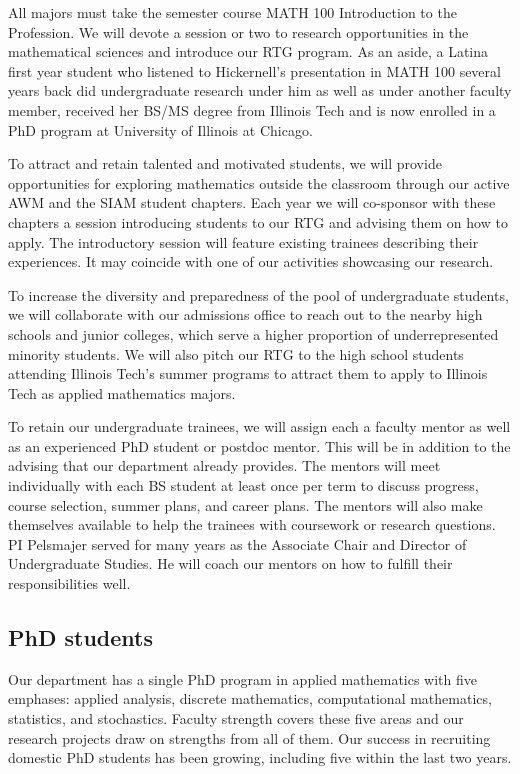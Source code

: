 \documentclass[11pt]{NSFamsart}
\begin{document}
All majors must take the semester course MATH 100 Introduction to the Profession.  We will devote a session or two to research opportunities in the mathematical sciences and introduce our RTG program. As an aside, a Latina first year student who listened to Hickernell's presentation in MATH 100 several years back did undergraduate research under him as well as under another faculty member, received her BS/MS degree from Illinois Tech and is now enrolled in a PhD program at University of Illinois at Chicago.

To attract and retain talented and motivated students, we will provide opportunities for exploring mathematics outside the classroom through our active AWM and the SIAM student chapters.  Each year we will co-sponsor with these chapters a session introducing students to our RTG and advising them on how to apply.  The introductory session will feature existing trainees describing their experiences. It may coincide with one of our activities showcasing our research.

To increase the diversity and preparedness of the pool of undergraduate students, we will collaborate with our admissions office to reach out to the nearby high schools and junior colleges, which serve a higher proportion of underrepresented minority students.  We will also pitch our RTG to the high school students attending Illinois Tech's summer programs to attract them to apply to Illinois Tech as applied mathematics majors.

To retain our undergraduate trainees, we will assign each a faculty mentor as well as an experienced PhD student or postdoc mentor.  This will be in addition to the advising that our department already provides.  The mentors will meet individually with each BS student at least once per term to discuss progress, course selection, summer plans, and career plans.  The mentors will also make themselves available to help the trainees with coursework or research questions.  PI Pelsmajer served for many years as the Associate Chair and Director of Undergraduate Studies. He will coach our mentors on how to fulfill their responsibilities well.

\subsection*{PhD students} 
Our department has a single PhD program in applied mathematics with five emphases: applied analysis, discrete mathematics, computational mathematics, statistics, and stochastics.  Faculty strength covers these five areas and our research projects draw on strengths from all of them. Our success in recruiting domestic PhD students has been growing, including five within the last two years. 
\end{document}
